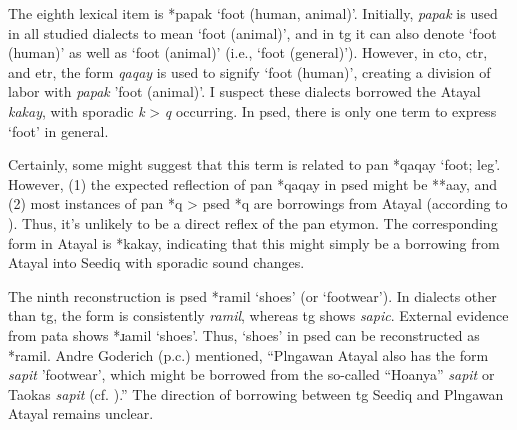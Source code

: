 The eighth lexical item is *papak `foot (human, animal)'. Initially, \textit{papak} is used in all studied dialects to mean `foot (animal)', and in \acl{tg} it can also denote `foot (human)' as well as `foot (animal)' (i.e., `foot (general)'). However, in \acl{cto}, \acl{ctr}, and \acl{etr}, the form \textit{qaqay} is used to signify `foot (human)', creating a division of labor with \textit{papak} 'foot (animal)'. I suspect these dialects borrowed the Atayal \textit{kakay}, with sporadic \textit{k} > \textit{q} occurring. In \acl{psed}, there is only one term to express `foot' in general.


Certainly, some might suggest that this term is related to \acl{pan} *qaqay `foot; leg'. However, (1) the expected reflection of \acs{pan} *qaqay in \acl{psed} might be **aay, and (2) most instances of \acs{pan} *q > \acs{psed} *q are borrowings from Atayal (according to \textcite{song2024sedq}). Thus, it's unlikely to be a direct reflex of the \acs{pan} etymon. The corresponding form in Atayal is *kakay, indicating that this might simply be a borrowing from Atayal into Seediq with sporadic sound changes.


The ninth reconstruction is \acl{psed} *ramil `shoes' (or `footwear'). In dialects other than \acl{tg}, the form is consistently \textit{ramil}, whereas \acl{tg} shows \textit{sapic}. External evidence from \acl{pata} shows *ɹamil `shoes'. Thus, `shoes' in \acl{psed} can be reconstructed as *ramil. Andre Goderich (p.c.) mentioned, ``Plngawan Atayal also has the form \textit{sapit} 'footwear', which might be borrowed from the so-called ``Hoanya'' \textit{sapit} or Taokas \textit{sapit} (cf. \cite[80]{tsuchida1982wp}).'' The direction of borrowing between \acl{tg} Seediq and Plngawan Atayal remains unclear.

